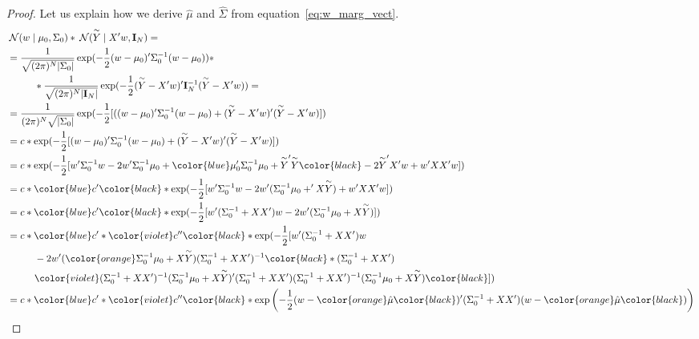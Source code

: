 \begin{proof}
Let us explain how we derive $\hat{\mu}$ and $\hat{\Sigma}$ from equation~\ref{eq:w_marg_vect}.
\begin{align}
& \norm(w \mid \mu_0, \Sigma_0) * \norm(\Yh \mid X'w, \unity_N) = \\
&= \frac{1}{\sqrt{(2\pi)^N|\Sigma_0|}}\exp({-\frac{1}{2}(w-\mu_0)'\Sigma_0^{-1}(w-\mu_0)}) * 
    \notag\\ &\mspace{50mu} 
    * \frac{1}{\sqrt{(2\pi)^N|\unity_N|}}\exp({-\frac{1}{2}(\Yh-X'w)'\unity_N^{-1}(\Yh-X'w)}) = \\
&= \frac{1}{(2\pi)^N \sqrt{|\Sigma_0|}}\exp({-\frac{1}{2}[((w-\mu_0)'\Sigma_0^{-1}(w-\mu_0) +  (\Yh-X'w)'(\Yh-X'w)]}) \\
&= c* \exp({-\frac{1}{2}[(w-\mu_0)'\Sigma_0^{-1}(w-\mu_0) +  (\Yh-X'w)'(\Yh-X'w)]}) \\
&= c* \exp({-\frac{1}{2}[w'\Sigma_0^{-1} w - 2w'\Sigma_0^{-1}\mu_0 + \color{blue}\mu_0'\Sigma_0^{-1}\mu_0 + \Yh'\Yh \color{black}-2\Yh'X'w  + w'XX'w]}) \\
&= c* \color{blue} c' \color{black} * \exp({-\frac{1}{2}[w'\Sigma_0^{-1} w - 2w'(\Sigma_0^{-1}\mu_0  + 'X\Yh)  + w'XX'w]}) \\
&= c* \color{blue} c' \color{black} * \exp({-\frac{1}{2}[w'(\Sigma_0^{-1} + XX') w - 2w'(\Sigma_0^{-1}\mu_0  + X\Yh)]}) \\
&= c* \color{blue} c' *\color{violet} c'' \color{black} * \exp (-\frac{1}{2}[w'(\Sigma_0^{-1} + XX') w 
    \notag\\ &\mspace{50mu} 
    - 2w'(\color{orange}\Sigma_0^{-1}\mu_0  + X\Yh)(\Sigma_0^{-1} + XX')^{-1}\color{black} * (\Sigma_0^{-1} + XX')
    \notag\\ &\mspace{50mu} 
\color{violet}(\Sigma_0^{-1} + XX')^{-1}(\Sigma_0^{-1}\mu_0 + X\Yh)'(\Sigma_0^{-1} + XX')(\Sigma_0^{-1} + XX')^{-1}(\Sigma_0^{-1}\mu_0 + X\Yh)\color{black}  ]) \\
&= c* \color{blue} c' *\color{violet} c'' \color{black} * \exp \left(-\frac{1}{2}(w - \color{orange}\hat{\mu}\color{black})' (\Sigma_0^{-1} + XX')(w - \color{orange}\hat{\mu}\color{black}) \right)
\end{align}
\end{proof}


